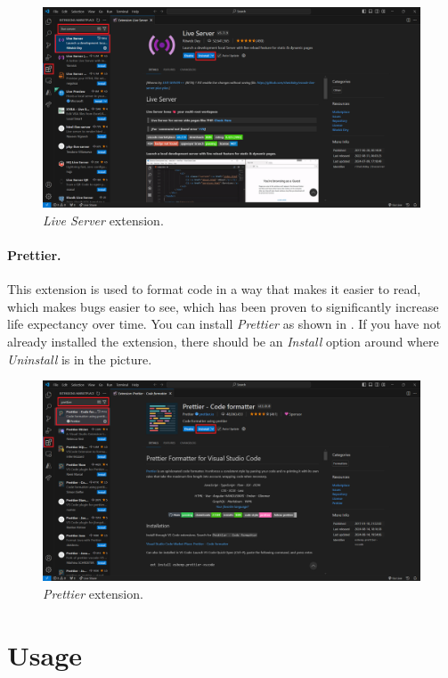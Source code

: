 \documentclass[a4paper,10pt]{article}
\begin{document}
\begin{figure}[htbp]
    \centering
    \includegraphics[width=\textwidth]{live_server.png}
    \caption{\emph{Live Server} extension.}
    \label{fig:live_server}   
\end{figure}

\paragraph{Prettier.} This extension is used to format code in a way that makes it easier to read, which makes bugs easier to see, which has been proven to significantly increase life expectancy over time. You can install \emph{Prettier} as shown in . If you have not already installed the extension, there should be an \emph{Install} option around where \emph{Uninstall} is in the picture.

\begin{figure}[htbp]
    \centering
    \includegraphics[width=\textwidth]{prettier.png}
    \caption{\emph{Prettier} extension.}
    \label{fig:prettier}   
\end{figure}

\clearpage
\section{Usage}
\end{document}
